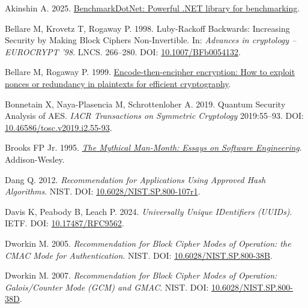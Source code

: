 \documentclass[fleqn,10pt,lineno]{wlpeerj}
\newlength{\cslhangindent}
\newenvironment{CSLReferences}[2]
 {\begin{list}{}{%
  \setlength{\itemindent}{0pt}
  \setlength{\leftmargin}{0pt}
  \setlength{\parsep}{0pt}
  \ifodd #1
   \setlength{\leftmargin}{\cslhangindent}
   \setlength{\itemindent}{-1\cslhangindent}
  \fi
  \setlength{\itemsep}{#2\baselineskip}}}
 {\end{list}}
\begin{document}
\protect{}\label{refs}
\begin{CSLReferences}{1}{0}
Akinshin A. 2025.
\href{https://github.com/dotnet/BenchmarkDotNet/releases/tag/v0.15.8}{{BenchmarkDotNet:
Powerful .NET library for benchmarking}}.

Bellare M, Krovetz T, Rogaway P. 1998. {Luby-Rackoff Backwards:
Increasing Security by Making Block Ciphers Non-Invertible}. In:
\emph{Advances in cryptology -- EUROCRYPT '98}. LNCS. 266--280. DOI:
\href{https://doi.org/10.1007/BFb0054132}{10.1007/BFb0054132}.

Bellare M, Rogaway P. 1999.
\href{https://escholarship.org/content/qt80n3m1fj/qt80n3m1fj_noSplash_361a5dfee4f53c7caaaf5eb0a73bc570.pdf}{{Encode-then-encipher
encryption: How to exploit nonces or redundancy in plaintexts for
efficient cryptography}}.

Bonnetain X, Naya-Plasencia M, Schrottenloher A. 2019. {Quantum Security
Analysis of AES}. \emph{IACR Transactions on Symmetric Cryptology}
2019:55--93. DOI:
\href{https://doi.org/10.46586/tosc.v2019.i2.55-93}{10.46586/tosc.v2019.i2.55-93}.

Brooks FP Jr. 1995.
\emph{\href{https://www.oreilly.com/library/view/mythical-man-month-the/0201835959/}{{The
Mythical Man-Month: Essays on Software Engineering}}}. Addison-Wesley.

Dang Q. 2012. \emph{{Recommendation for Applications Using Approved Hash
Algorithms}}. NIST. DOI:
\href{https://doi.org/10.6028/NIST.SP.800-107r1}{10.6028/NIST.SP.800-107r1}.

Davis K, Peabody B, Leach P. 2024. \emph{{Universally Unique IDentifiers
(UUIDs)}}. IETF. DOI:
\href{https://doi.org/10.17487/RFC9562}{10.17487/RFC9562}.

Dworkin M. 2005. \emph{{Recommendation for Block Cipher Modes of
Operation: the CMAC Mode for Authentication}}. NIST. DOI:
\href{https://doi.org/10.6028/NIST.SP.800-38B}{10.6028/NIST.SP.800-38B}.

Dworkin M. 2007. \emph{{Recommendation for Block Cipher Modes of
Operation: Galois/Counter Mode (GCM) and GMAC}}. NIST. DOI:
\href{https://doi.org/10.6028/NIST.SP.800-38D}{10.6028/NIST.SP.800-38D}.


\end{CSLReferences}
\end{document}
